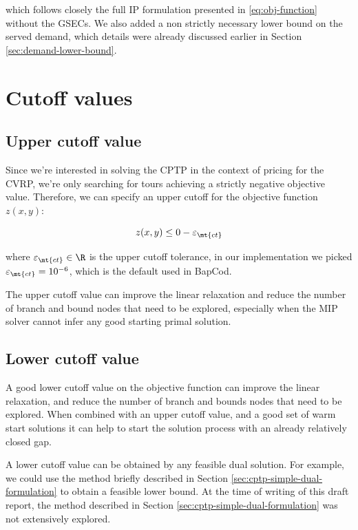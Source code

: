 which follows closely the full IP formulation presented in \eqref{eq:obj-function} without the GSECs.
We also added a non strictly necessary lower bound on the served demand, which details were already discussed earlier in Section \ref{sec:demand-lower-bound}.

\section{Cutoff values}


\subsection{Upper cutoff value}
Since we're interested in solving the CPTP in the context of pricing for the CVRP, we're only searching for tours achieving a strictly negative objective value.
Therefore, we can specify an upper cutoff for the objective function $z(x, y)$:

\begin{equation}
	z(x, y) \le 0 - \varepsilon_{\mt{ct}}
\end{equation}

where $\varepsilon_{\mt{ct}} \in \R$ is the upper cutoff tolerance, in our implementation we picked $\varepsilon_{\mt{ct}} = 10^{-6}$, which is the default used in BapCod.

The upper cutoff value can improve the linear relaxation and reduce the number of branch and bound nodes that need to be explored, especially when the MIP solver cannot infer any good starting primal solution.

\subsection{Lower cutoff value}
A good lower cutoff value on the objective function can improve the linear relaxation, and reduce the number of branch and bounds nodes that need to be explored.
When combined with an upper cutoff value, and a good set of warm start solutions it can help to start the solution process with an already relatively closed gap.

A lower cutoff value can be obtained by any feasible dual solution.
For example, we could use the method briefly described in Section \ref{sec:cptp-simple-dual-formulation} to obtain a feasible lower bound.
At the time of writing of this draft report, the method described in Section \ref{sec:cptp-simple-dual-formulation} was not extensively explored.

